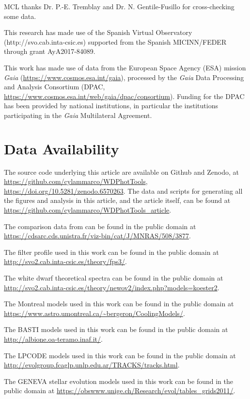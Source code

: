 \documentclass[fleqn,usenatbib]{rasti}
\begin{document}
MCL thanks Dr. P.-E. Tremblay and Dr. N. Gentile-Fusillo for cross-checking
some data.

This research has made use of the Spanish Virtual Observatory
(http://svo.cab.inta-csic.es) supported from the Spanish MICINN/FEDER through
grant AyA2017-84089.

This work has made use of data from the European Space Agency (ESA) mission
{\it Gaia} (\url{https://www.cosmos.esa.int/gaia}), processed by the {\it Gaia}
Data Processing and Analysis Consortium (DPAC,
\url{https://www.cosmos.esa.int/web/gaia/dpac/consortium}). Funding for the DPAC
has been provided by national institutions, in particular the institutions
participating in the {\it Gaia} Multilateral Agreement.

\section*{Data Availability}
The source code underlying this article are available on Github and Zenodo, at \url{https://github.com/cylammarco/WDPhotTools}, \url{https://doi.org/10.5281/zenodo.6570263}. The data and scripts for generating all the figures and analysis in this article, and the article itself, can be found at \url{https://github.com/cylammarco/WDPhotTools_article}.

The comparison data from \citet{2021MNRAS.508.3877G} can be found in the public domain at \url{https://cdsarc.cds.unistra.fr/viz-bin/cat/J/MNRAS/508/3877}.

The filter profile used in this work can be found in the public domain at \url{http://svo2.cab.inta-csic.es/theory/fps3/}.

The white dwarf theoretical spectra can be found in the public domain at \url{http://svo2.cab.inta-csic.es/theory/newov2/index.php?models=koester2}.

The Montreal models used in this work can be found in the public domain at \url{https://www.astro.umontreal.ca/~bergeron/CoolingModels/}.

The BASTI models used in this work can be found in the public domain at \url{http://albione.oa-teramo.inaf.it/}.

The LPCODE models used in this work can be found in the public domain at \url{http://evolgroup.fcaglp.unlp.edu.ar/TRACKS/tracks.html}.

The GENEVA stellar evolution models used in this work can be found in the public domain at \url{https://obswww.unige.ch/Research/evol/tables_grids2011/}.
\end{document}
